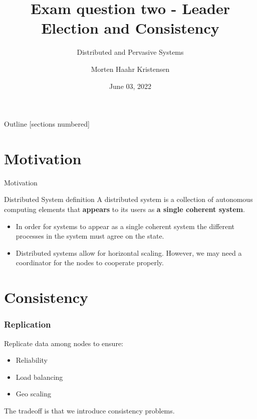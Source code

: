 \documentclass[10pt]{beamer}
\title[Leader Election and Consistency]{Exam question two - Leader Election and Consistency}
\subtitle{Distributed and Pervasive Systems}
\date{June 03, 2022}
\author[M.H. Kristensen]{Morten Haahr Kristensen}
\institute{Department of Electrical and Computer Engineering - Aarhus University}
\begin{document}
\maketitle

\begin{frame}{Outline}
  [sections numbered]
  \tableofcontents[hideallsubsections]
\end{frame}


\section{Motivation}

\begin{frame}{Motivation}
  \begin{alertblock}{Distributed System definition \cite{vansteenDistributedSystems2018}}
    A distributed system is a collection of autonomous computing elements that \textbf{appears} to its users as \textbf{a single coherent system}.
  \end{alertblock}
  \begin{itemize}
    \item In order for systems to appear as a single coherent system the different processes in the system must agree on the state.
    \item Distributed systems allow for horizontal scaling. However, we may need a coordinator for the nodes to cooperate properly.
  \end{itemize}
\end{frame}

\section{Consistency}
\begin{frame}
  \frametitle{Replication}
  Replicate data among nodes to ensure:
  \begin{itemize}
    \item Reliability
    \item Load balancing
    \item Geo scaling
  \end{itemize}
  The tradeoff is that we introduce consistency problems.
\end{frame}
\end{document}
